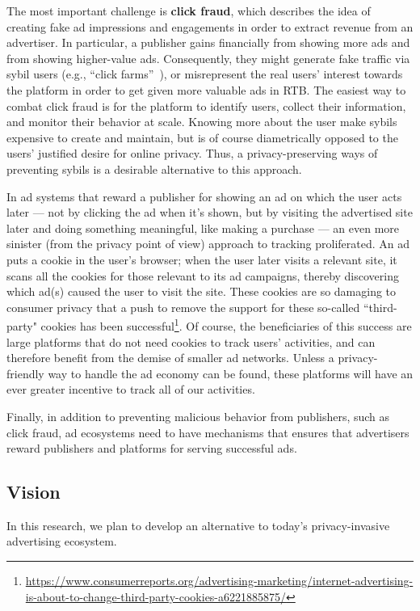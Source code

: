 %
The most important challenge is \textbf{click fraud}, which describes the idea
of creating fake ad impressions and engagements in order to extract revenue from
an advertiser.
%
In particular, a publisher gains financially from showing more ads and from
showing higher-value ads.
%
Consequently, they might generate fake traffic via sybil users (e.g., ``click
farms''~\cite{understanding-ad-fraud}), or misrepresent the real users' interest
towards the platform in order to get given more valuable ads in RTB.
%
The easiest way to combat click fraud is for the platform to identify users,
collect their information, and monitor their behavior at scale.
%
Knowing more about the user make sybils expensive to create and maintain, but is
of course diametrically opposed to the users' justified desire for online
privacy.
%
Thus, a privacy-preserving ways of preventing sybils is a desirable alternative to this approach.


In ad systems that reward a publisher for showing an ad on which the user acts later --- not by clicking the ad when it's shown, but by visiting the advertised site later and doing something meaningful, like making a purchase --- an even more sinister (from the privacy point of view) approach to tracking proliferated.  
%
An ad puts a cookie in the user's browser; when the user later visits a relevant site, it scans all the cookies for those relevant to its ad campaigns, thereby discovering which ad(s) caused the user to visit the site.
%
These cookies are so damaging to consumer privacy that a push to remove the support for these so-called ``third-party" cookies has been successful\footnote{\url{https://www.consumerreports.org/advertising-marketing/internet-advertising-is-about-to-change-third-party-cookies-a6221885875/}}.
%
Of course, the beneficiaries of this success are large platforms that do not need cookies to track users' activities, and can therefore benefit from the demise of smaller ad networks.
%
Unless a privacy-friendly way to handle the ad economy can be found, these platforms will have an ever greater incentive to track all of our activities.

Finally, in addition to preventing malicious behavior from publishers, such as click fraud, ad ecosystems need to have mechanisms that ensures that advertisers reward publishers and platforms for serving successful ads.  

\subsection{Vision}
%
In this research, we plan to develop an alternative to today's privacy-invasive
advertising ecosystem.
%


